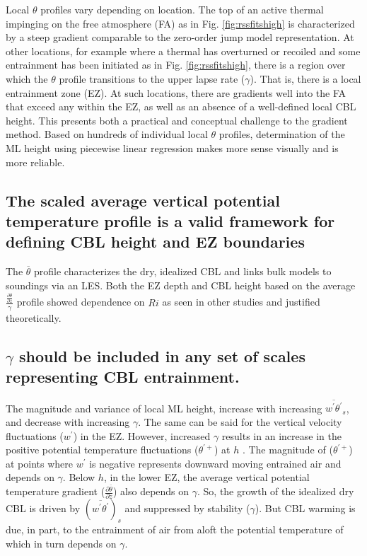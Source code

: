 \documentclass[referee]{svjour3}
\begin{document}
Local $\theta$ profiles vary depending on location.  The top of an active thermal impinging on the free atmosphere (FA) as in Fig. \ref{fig:rssfitshigh} is characterized by a steep gradient comparable to the zero-order jump model representation.  At other locations, for example where a thermal has overturned or recoiled and some entrainment has been initiated as in Fig. \ref{fig:rssfitshigh}, there is a region over which the $\theta$ profile transitions to the upper lapse rate ($\gamma$). That is, there is a local entrainment zone (EZ).  At such locations, there are gradients well into the FA that exceed any within the EZ, as well as an absence of a well-defined local CBL height.  This presents both a practical and conceptual challenge to the gradient method.  Based on hundreds of individual local $\theta$ profiles, determination of the ML height using piecewise linear regression makes more sense visually and is more reliable. 

\subsection{The scaled average vertical potential temperature profile is a valid framework for defining CBL height and EZ boundaries}

The $\overline{\theta}$ profile characterizes the dry, idealized CBL and links bulk models to soundings via an LES.  Both the EZ depth and CBL height based on the average $\frac{\frac{\partial \overline{\theta}}{\partial z}}{\gamma}$ profile showed dependence on $Ri$ as seen in other studies and justified theoretically.  

\subsection{$\gamma$ should be included in any set of scales representing CBL entrainment.}

The magnitude and variance of local ML height, increase with increasing $\overline{w^{'}\theta^{'}}_{s}$, and decrease with increasing $\gamma$.  The same can be said for the vertical velocity fluctuations ($w^{'}$) in the EZ.  However, increased $\gamma$ results in an increase in the positive potential temperature fluctuations ($\theta^{'+}$) at $h$ \citep{NChap14}. The magnitude of ($\theta^{'+}$) at points where $w^{'}$ is negative represents downward moving entrained air and depends on $\gamma$.  Below $h$, in the lower EZ, the average vertical potential temperature gradient ($\frac{\partial \overline{\theta}}{\partial z}$) also depends on $\gamma$. So, the growth of the idealized dry CBL is driven by $(\overline{w^{'}\theta^{'}})_{s}$ and suppressed by stability ($\gamma$). But CBL warming is due, in part, to the entrainment of air from aloft the potential temperature of which in turn depends on $\gamma$.\\
\end{document}
